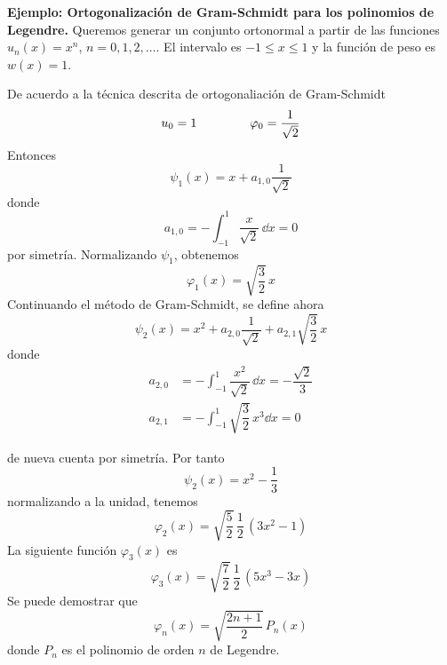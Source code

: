 \begin{ejemplo} \textbf{Ejemplo: Ortogonalización de Gram-Schmidt para los polinomios de Legendre.}
Queremos generar un conjunto ortonormal a partir de las funciones $u_{n}(x)=x^{n}$, $n=0,1,2,\ldots$. El intervalo es $-1 \leq x \leq 1$ y la función de peso es $w(x)=1$.

De acuerdo a la técnica descrita de ortogonaliación de Gram-Schmidt
\begin{equation}
u_{0} = 1 \hspace{1.5cm} \varphi_{0} =  \dfrac{1}{\sqrt{2}}
\label{eq:ecuacion_10_50}
\end{equation}
Entonces
\begin{equation}
\psi_{1}(x) = x + a_{1,0} \dfrac{1}{\sqrt{2}}
\label{eq:ecuacion_10_51}
\end{equation}
donde
\begin{equation}
a_{1, 0} = - \int_{-1}^{1} \dfrac{x}{\sqrt{2}} \, \dd x = 0
\label{eq:ecuacion_10_52}
\end{equation}
por simetría. Normalizando $\psi_{1}$, obtenemos
\begin{equation}
\varphi_{1}(x) = \sqrt{\dfrac{3}{2}} \, x
\label{eq:ecuacion_10_53}
\end{equation}
Continuando el método de Gram-Schmidt, se define ahora
\begin{equation}
\psi_{2} (x) = x^{2} +  a_{2, 0} \dfrac{1}{\sqrt{2}} +  a_{2, 1} \sqrt{\dfrac{3}{2}} \, x
\label{eq:ecuacion_10_54}
\end{equation}
donde
\begin{align}
a_{2, 0} &= - \int_{-1}^{1} \dfrac{x^{2}}{\sqrt{2}} \, \dd x = - \dfrac{\sqrt{2}}{3} \label{eq:ecuacion_10_55} \\[1em] 
a_{2, 1} &= - \int_{-1}^{1} \sqrt{\dfrac{3}{2}} \, x^{3} \dd x = 0 \label{eq:ecuacion_10_56}
\end{align}

\end{ejemplo}
de nueva cuenta por simetría. Por tanto
\begin{equation}
\psi_{2}(x) = x^{2} - \dfrac{1}{3}
\label{eq:ecuacion_10_57}
\end{equation}
normalizando a la unidad, tenemos
\begin{equation}
\varphi_{2} (x) = \sqrt{\dfrac{5}{2}} \, \dfrac{1}{2} \, (3 x^{2} - 1)
\label{eq:ecuacion_10_58}
\end{equation}
La siguiente función $\varphi_{3}(x)$ es
\begin{equation}
\varphi_{3} (x) = \sqrt{\dfrac{7}{2}} \, \dfrac{1}{2} \, (5 x^{3} - 3x)
\label{eq:ecuacion_10_59}
\end{equation}
Se puede demostrar que
\begin{equation}
\varphi_{n}(x) = \sqrt{\dfrac{2n+1}{2}} \, P_{n}(x)
\label{eq:ecuacion_59}
\end{equation}
donde $P_{n}$ es el polinomio de orden $n$ de Legendre.
